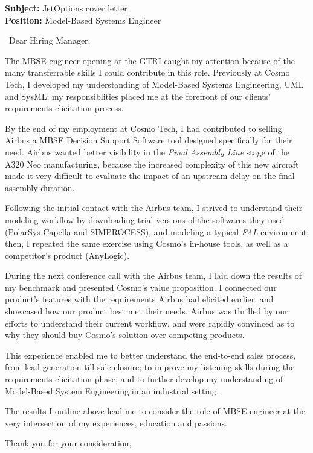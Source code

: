 \documentclass{letter}
\begin{document}
\signature{Marius Peter}
\longindentation=0pt
\address{11090 Strathmore Dr\\Los Angeles CA 90024\\USA}


\begin{letter}{
\textbf{Subject:} JetOptions cover letter\\
\textbf{Position:} Model-Based Systems Engineer\\
}
\opening{\vfill~Dear Hiring Manager,}

The MBSE engineer opening at the GTRI caught my attention because of the many transferrable skills I could contribute in this role.
Previously at Cosmo Tech, I developed my understanding of Model-Based Systems Engineering, UML and SysML; my responsiblities placed me at the forefront of our clients' requirements elicitation process. 

By the end of my employment at Cosmo Tech, I had contributed to selling Airbus a MBSE Decision Support Software tool designed specifically for their need.
Airbus wanted better visibility in the \textit{Final Assembly Line} stage of the A320 Neo manufacturing, because the increased complexity of this new aircraft made it very difficult to evaluate the impact of an upstream delay on the final assembly duration.

Following the initial contact with the Airbus team, I strived to understand their modeling workflow by downloading trial versions of the softwares they used (PolarSys Capella and SIMPROCESS), and modeling a typical \textit{FAL} environment;
then, I repeated the same exercise using Cosmo's in-house tools, as well as a competitor's product (AnyLogic).

During the next conference call with the Airbus team, I laid down the results of my benchmark and presented Cosmo's value proposition.
I connected our product's features with the requirements Airbus had elicited earlier, and showcased how our product best met their needs.
Airbus was thrilled by our efforts to understand their current workflow, and were rapidly convinced as to why they should buy Cosmo's solution over competing products.

This experience enabled me to better understand the end-to-end sales process, from lead generation till sale closure;
to improve my listening skills during the requirements elicitation phase;
and to further develop my understanding of Model-Based System Engineering in an industrial setting. 

The results I outline above lead me to consider the role of MBSE engineer at the very intersection of my experiences, education and passions.

\closing{Thank you for your consideration,}

\end{letter}
\end{document}
